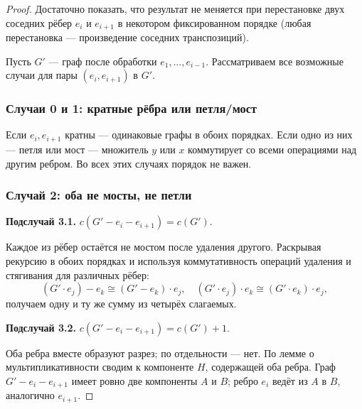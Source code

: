 \begin{proof}
  Достаточно показать, что результат не меняется при перестановке
  двух соседних рёбер $e_i$ и $e_{i+1}$ в некотором фиксированном порядке
  (любая перестановка --- произведение соседних транспозиций).

  Пусть $G'$ --- граф после обработки $e_1,\dots,e_{i-1}$.
  Рассматриваем все возможные случаи для пары $(e_i,e_{i+1})$ в $G'$.

  \subsubsection*{Случаи 0 и 1: кратные рёбра или петля/мост}

  Если $e_i,e_{i+1}$ кратны --- одинаковые графы в обоих порядках.
  Если одно из них --- петля или мост --- множитель $y$ или $x$ коммутирует
  со всеми операциями над другим ребром. Во всех этих случаях порядок не важен.

  \subsubsection*{Случай 2: оба не мосты, не петли}

  \noindent\textbf{Подслучай 3.1.} $c(G'-e_i-e_{i+1})=c(G')$.

  Каждое из рёбер остаётся не мостом после удаления другого.
  Раскрывая рекурсию в обоих порядках и используя коммутативность
  операций удаления и стягивания для различных рёбер:
  \[
    (G'\cdot e_j)-e_k \cong (G'-e_k)\cdot e_j,\quad
    (G'\cdot e_j)\cdot e_k \cong (G'\cdot e_k)\cdot e_j,
  \]
  получаем одну и ту же сумму из четырёх слагаемых.

  \medskip
  \noindent\textbf{Подслучай 3.2.} $c(G'-e_i-e_{i+1})=c(G')+1$.

  Оба ребра вместе образуют разрез; по отдельности --- нет.
  По лемме о мультипликативности сводим к компоненте $H$,
  содержащей оба ребра. Граф $G'-e_i-e_{i+1}$ имеет ровно
  две компоненты $A$ и $B$; ребро $e_i$ ведёт из $A$ в $B$,
  аналогично $e_{i+1}$.


\end{proof}

